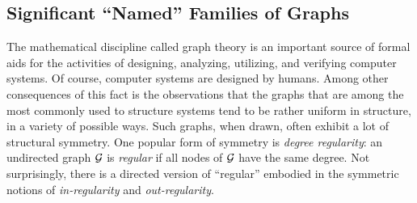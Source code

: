 \subsection{Significant ``Named'' Families of Graphs}
\label{sec:graphs-important-families}

The mathematical discipline called graph theory is an important source
of formal aids for the activities of designing, analyzing, utilizing,
and verifying computer systems.  Of course, computer systems are
designed by humans.  Among other consequences of this fact is the
observations that the graphs that are among the most commonly used to
structure systems tend to be rather uniform in structure, in a variety
of possible ways.  Such graphs, when drawn, often exhibit a lot of
structural symmetry.  One popular form of symmetry is {\it degree
  regularity}: an undirected graph $\mbox{$\cal G$}$ is {\it regular}
 if all nodes of $\mbox{$\cal G$}$ have the same degree.  Not
surprisingly, there is a directed version of ``regular'' embodied in the
symmetric notions of {\it in-regularity}
 and {\it out-regularity}.

\medskip


